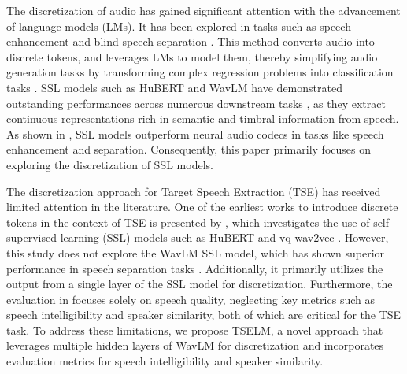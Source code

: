 \documentclass[conference]{IEEEtran}
\begin{document}
The discretization of audio has gained significant attention with the advancement of language models (LMs). It has been explored in
tasks such as speech enhancement \cite{selm} and blind speech separation \cite{dasb,tokensplit}.
This method converts audio into discrete tokens, and leverages LMs to model them, thereby simplifying audio generation tasks by transforming complex regression problems into classification tasks \cite{dasb}. SSL models such as HuBERT \cite{hubert} and WavLM \cite{wavlm} have demonstrated outstanding performances across numerous downstream tasks \cite{superb}, as they extract continuous representations rich in semantic and timbral information from speech. As shown in \cite{dasb}, SSL models outperform neural audio codecs \cite{dac} in tasks like speech enhancement and separation. Consequently, this paper primarily focuses on exploring the discretization of SSL models.

The discretization approach for Target Speech Extraction (TSE) has received limited attention in the literature. One of the earliest works to introduce discrete tokens in the context of TSE is presented by \cite{gen_tse}, which investigates the use of self-supervised learning (SSL) models such as HuBERT and vq-wav2vec \cite{vq_wav2vec}. However, this study does not explore the WavLM SSL model, which has shown superior performance in speech separation tasks \cite{wavlm}. Additionally, it primarily utilizes the output from a single layer of the SSL model for discretization. Furthermore, the evaluation in \cite{gen_tse} focuses solely on speech quality, neglecting key metrics such as speech intelligibility and speaker similarity, both of which are critical for the TSE task. To address these limitations, we propose TSELM, a novel approach that leverages multiple hidden layers of WavLM for discretization and incorporates evaluation metrics for speech intelligibility and speaker similarity.
\end{document}
